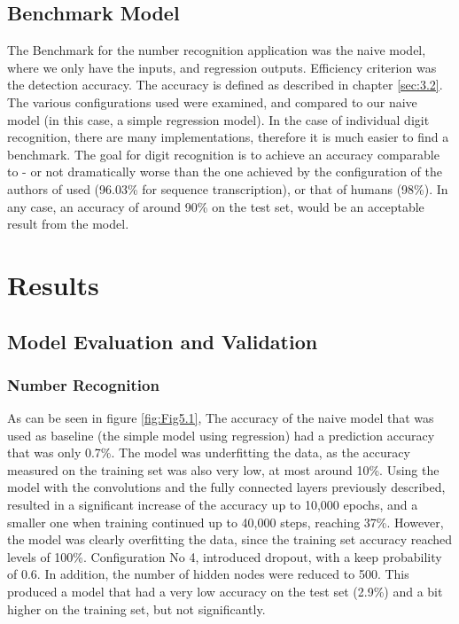 \documentclass[final,12p,times]{elsarticle}
\begin{document}
\subsection{Benchmark Model}
\label{sec:4.3}
The Benchmark for the number recognition application was the naive model, where we only have the inputs, and regression outputs.
Efficiency criterion was the detection accuracy.
The accuracy is defined as described in chapter \ref{sec:3.2}.
The various configurations used were examined, and compared to our naive model (in this case, a simple regression model).
In the case of individual digit recognition, there are many implementations, therefore it is much easier to find a benchmark.
The goal for digit recognition is to achieve an accuracy comparable to - or not dramatically worse than
the one achieved by the configuration of the authors of \cite{DBLP:journals/corr/GoodfellowBIAS13} used (96.03\% for sequence transcription), 
or that of humans (98\%).
In any case, an accuracy of around 90\% on the test set, would be an acceptable result from the model.


 
\section{Results}
\label{sec:5}
\subsection{Model Evaluation and Validation}
\label{sec:5.1}
\subsubsection{Number Recognition}
\label{sec:5.1.1}
As can be seen in figure \ref{fig:Fig5.1}, The accuracy of the naive model that was used as baseline (the simple model using regression) 
had a prediction accuracy that was only 0.7\%.
The model was underfitting the data, as the accuracy measured on the training set was also very low, at most around 10\%.
Using the model with the convolutions and the fully connected layers previously described, resulted in a significant increase of the accuracy up to 10,000 epochs, 
and a smaller one when training continued up to 40,000 steps, reaching 37\%.
However, the model was clearly overfitting the data, since the training set accuracy reached levels of 100\%.
Configuration No 4, introduced dropout, with a keep probability of 0.6.
In addition, the number of hidden nodes were reduced to 500.
This produced a model that had a very low accuracy on the test set (2.9\%) and a bit higher on the training set, but not significantly.
\end{document}
